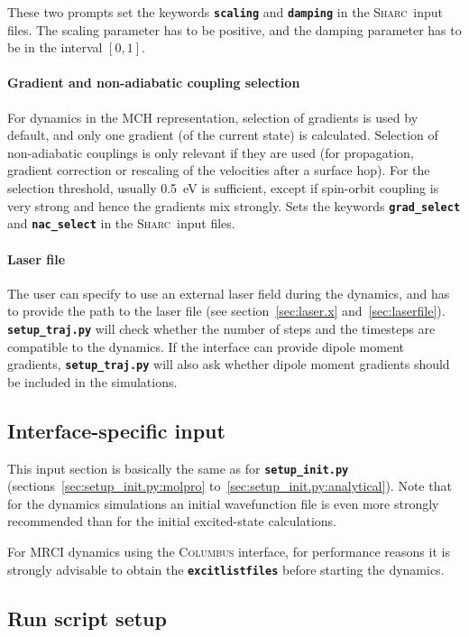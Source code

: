 \documentclass[a4paper,11pt,DIV=15,openany,twoside=false]{scrbook}
\newcommand{\sharc}{\textsc{Sharc}}
\newcommand{\ttt}[1]{\textbf{\texttt{#1}}}
\begin{document}
These two prompts set the keywords \ttt{scaling} and \ttt{damping} in the \sharc\ input files. The scaling parameter has to be positive, and the damping parameter has to be in the interval $[0,1]$.

\paragraph{Gradient and non-adiabatic coupling selection}

For dynamics in the MCH representation, selection of gradients is used by default, and only one gradient (of the current state) is calculated. Selection of non-adiabatic couplings is only relevant if they are used (for propagation, gradient correction or rescaling of the velocities after a surface hop). For the selection threshold, usually 0.5~eV is sufficient, except if spin-orbit coupling is very strong and hence the gradients mix strongly.
Sets the keywords \ttt{grad\_select} and \ttt{nac\_select} in the \sharc\ input files.

\paragraph{Laser file}

The user can specify to use an external laser field during the dynamics, and has to provide the path to the laser file (see section~\ref{sec:laser.x} and~\ref{sec:laserfile}). \ttt{setup\_traj.py} will check whether the number of steps and the timesteps are compatible to the dynamics. If the interface can provide dipole moment gradients, \ttt{setup\_traj.py} will also ask whether dipole moment gradients should be included in the simulations.

\subsection{Interface-specific input}

This input section is basically the same as for \ttt{setup\_init.py} (sections~\ref{sec:setup_init.py:molpro} to~\ref{sec:setup_init.py:analytical}). Note that for the dynamics simulations an initial wavefunction file is even more strongly recommended than for the initial excited-state calculations.

For MRCI dynamics using the \textsc{Columbus} interface, for performance reasons it is strongly advisable to obtain the \ttt{excitlistfiles} before starting the dynamics. 

\subsection{Run script setup}
\end{document}
